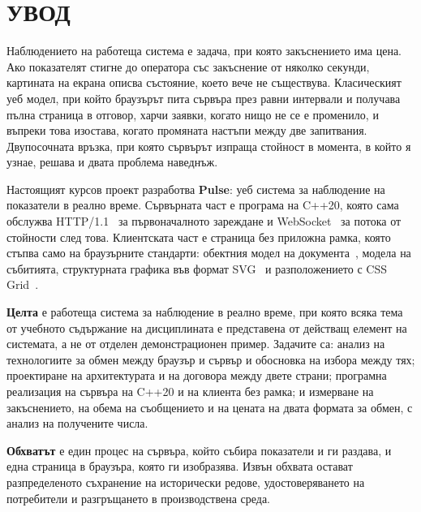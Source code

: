 \section*{УВОД}
\label{sec:introduction}

Наблюдението на работеща система е задача, при която закъснението има цена. Ако
показателят стигне до оператора със закъснение от няколко секунди, картината на екрана
описва състояние, което вече не съществува. Класическият уеб модел, при който браузърът
пита сървъра през равни интервали и получава пълна страница в отговор, харчи заявки,
когато нищо не се е променило, и въпреки това изостава, когато промяната настъпи между
две запитвания. Двупосочната връзка, при която сървърът изпраща стойност в момента, в
който я узнае, решава и двата проблема наведнъж.

Настоящият курсов проект разработва \textbf{Pulse}: уеб система за наблюдение на
показатели в реално време. Сървърната част е програма на C++20, която сама обслужва
HTTP/1.1~\cite{rfc9112} за първоначалното зареждане и WebSocket~\cite{rfc6455} за потока
от стойности след това. Клиентската част е страница без приложна рамка, която стъпва само
на браузърните стандарти: обектния модел на документа~\cite{dom_ls}, модела на събитията,
структурната графика във формат SVG~\cite{svg2} и разположението с CSS
Grid~\cite{css_grid1}.

\textbf{Целта} е работеща система за наблюдение в реално време, при която всяка тема от
учебното съдържание на дисциплината е представена от действащ елемент на системата, а не
от отделен демонстрационен пример. Задачите са: анализ на технологиите за обмен между
браузър и сървър и обосновка на избора между тях; проектиране на архитектурата и на
договора между двете страни; програмна реализация на сървъра на C++20 и на клиента без
рамка; и измерване на закъснението, на обема на съобщението и на цената на двата формата
за обмен, с анализ на получените числа.

\textbf{Обхватът} е един процес на сървъра, който събира показатели и ги раздава, и една
страница в браузъра, която ги изобразява. Извън обхвата остават разпределеното съхранение
на исторически редове, удостоверяването на потребители и разгръщането в производствена
среда.
